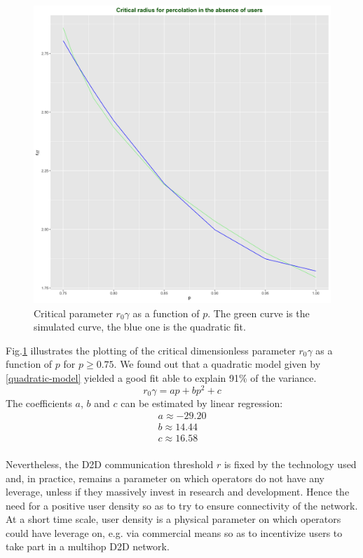 \documentclass[conference]{IEEEtran}
\begin{document}
\begin{figure}[t!]
\centering
\includegraphics[width=\columnwidth]{Figures/critical-radius-lambda_0-quadratic-fit.png}
\caption{Critical parameter $r_{0}\gamma$ as a function of $p$. The green curve is the simulated curve, the blue one is the quadratic fit.}
\label{quadratic-fit-radius}
\end{figure}
\indent Fig.\ref{quadratic-fit-radius} illustrates the plotting of the critical dimensionless parameter $r_{0}\gamma$ as a function of $p$ for $p \geq 0.75$. We found out that a quadratic model given by \eqref{quadratic-model} yielded a good fit able to explain 91\% of the variance.
\begin{equation}
\label{quadratic-model}
r_{0}\gamma = ap + bp^{2} + c
\end{equation}
The coefficients $a$, $b$ and $c$ can be estimated by linear regression:
\begin{equation}
\begin{array}{l}
a \approx -29.20 \\
b \approx 14.44 \\
c \approx 16.58
\end{array}
\end{equation}
\\
\indent Nevertheless, the D2D communication threshold $r$ is fixed by the technology used and, in practice, remains a parameter on which operators do not have any leverage, unless if they massively invest in research and development. Hence the need for a positive user density so as to try to ensure connectivity of the network. At a short time scale, user density is a physical parameter on which operators could have leverage on, e.g. via commercial means so as to incentivize users to take part in a multihop D2D network.
\end{document}
